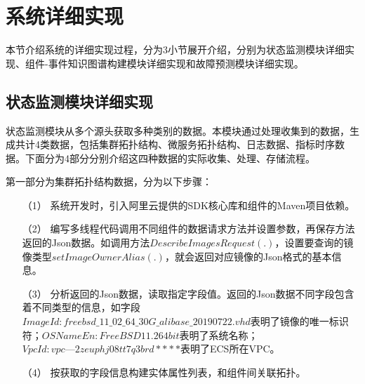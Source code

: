 \section{系统详细实现}
本节介绍系统的详细实现过程，分为3小节展开介绍，分别为状态监测模块详细实现、组件-事件知识图谱构建模块详细实现和故障预测模块详细实现。

\subsection{状态监测模块详细实现}\label{data-collect-way}
状态监测模块从多个源头获取多种类别的数据。本模块通过处理收集到的数据，生成共计4类数据，包括集群拓扑结构、微服务拓扑结构、日志数据、指标时序数据。下面分为4部分分别介绍这四种数据的实际收集、处理、存储流程。

第一部分为集群拓扑结构数据，分为以下步骤：
\begin{itemize}
    \item [（1）]系统开发时，引入阿里云提供的SDK核心库和组件的Maven项目依赖。
    \item [（2）]编写多线程代码调用不同组件的数据请求方法并设置参数，再保存方法返回的Json数据。如调用方法$DescribeImagesRequest(.)$，设置要查询的镜像类型$setImageOwnerAlias(.)$，就会返回对应镜像的Json格式的基本信息。
    \item [（3）]分析返回的Json数据，读取指定字段值。返回的Json数据不同字段包含着不同类型的信息，如字段$ ImageId: freebsd\_11\_02\_64\_30G\_alibase\_20190722.vhd$表明了镜像的唯一标识符；$OSNameEn: FreeBSD  11.2 64 bit$表明了系统名称；$VpcId:vpc—2zeuphj08tt7q3brd****$表明了ECS所在VPC。
    \item [（4）]按获取的字段信息构建实体属性列表，和组件间关联拓扑。
\end{itemize}




